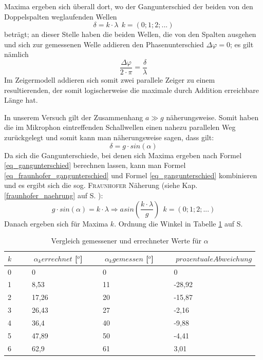 Maxima ergeben sich überall dort, wo der Gangunterschied der beiden von den Doppelspalten weglaufenden Wellen 
\begin{equation}
	\delta = k \cdot \lambda ~~ k = (0; 1; 2; ...)   
	\label{eq_gangunterschied}
\end{equation}
beträgt; an dieser Stelle haben die beiden Wellen, die von den Spalten ausgehen und sich zur gemessenen Welle addieren den Phasenunterschied \(\Delta \varphi = 0\); es gilt nämlich
\begin{equation} 
   \frac{\Delta \varphi}{2 \cdot \pi} = \frac{\delta}{\lambda}
   \label{eq_zshg_gangunterschied-phasendiffernz}
\end{equation} 
Im Zeigermodell addieren sich somit zwei parallele Zeiger zu einem resultierenden, der somit logischerweise die maximale durch Addition erreichbare Länge hat.


In unserem Versuch gilt der Zusammenhang \(a \gg g\) näherungsweise. Somit haben die im Mikrophon eintreffenden Schallwellen einen nahezu parallelen Weg zurückgelegt und somit kann man näherungsweise sagen, dass gilt:
\begin{equation}
   \delta = g \cdot sin( \alpha )
   \label{eq_fraunhofer_gangunterschied}
\end{equation}
Da sich die Gangunterschiede, bei denen sich Maxima ergeben nach Formel \ref{eq_gangunterschied} berechnen lassen, kann man Formel \ref{eq_fraunhofer_gangunterschied} und Formel \ref{eq_gangunterschied} kombinieren und es ergibt sich die sog. \textsc{Fraunhofer} Näherung (siehe Kap. \ref{fraunhofer_naehrung} auf S. \pageref{fraunhofer_naehrung}):
\begin{equation}
   g \cdot sin( \alpha ) = k \cdot \lambda \Rightarrow asin\left ( \frac{k \cdot \lambda}{g}\right )   ~~ k = (0; 1; 2; ...)   
\end{equation}
Danach ergeben sich für Maxima \(k\). Ordnung die Winkel in Tabelle \ref{tab_alpha_k} auf S. \pageref{tab_alpha_k}

\begin{table}
\centering
\begin{tabular}{l|l|l|l}
\(k\) &~~~ \(\alpha_k errechnet\) [\(^o\)] &~~~ \(\alpha_k gemessen\) [\(^o\)] &~~~ \(prozentuale Abweichung\) \\
\hline
0	&~~~	0	&~~~	0	&~~~	0\\
1	&~~~	8,53	&~~~	11	&~~~	-28,92\\
2	&~~~	17,26	&~~~	20	&~~~	-15,87\\
3	&~~~	26,43	&~~~	27	&~~~	-2,16\\
4	&~~~	36,4	&~~~	40	&~~~	-9,88\\
5	&~~~	47,89	&~~~	50	&~~~	-4,41\\
6	&~~~	62,9	&~~~	61	&~~~	3,01\\
\end{tabular}
\caption{Vergleich gemessener und errechneter Werte für \(\alpha\)}
\label{tab_alpha_k}
\end{table}



